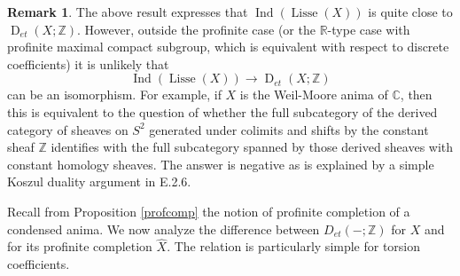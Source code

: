 \documentclass[12pt]{article}
\theoremstyle{definition}
\newtheorem{remark}[theorem]{Remark}
\newcommand{\on}{\operatorname}
\newcommand{\mbb}{\mathbb}
\newcommand{\wh}{\widehat}
\begin{document}
\begin{remark}
The above result expresses that $\on{Ind}(\on{Lisse}(X))$ is quite close to $\on{D}_{et}(X;\mbb{Z})$.  However, outside the profinite case (or the $\mbb{R}$-type case with profinite maximal compact subgroup, which is equivalent with respect to discrete coefficients) it is unlikely that
$$\on{Ind}(\on{Lisse}(X)) \to \on{D}_{et}(X;\mbb{Z})$$
can be an isomorphism.  For example, if $X$ is the Weil-Moore anima of $\mbb{C}$, then this is equivalent to the question of whether the full subcategory of the derived category of sheaves on $S^2$ generated under colimits and shifts by the constant sheaf $\mbb{Z}$ identifies with the full subcategory spanned by those derived sheaves with constant homology sheaves.  The  answer is negative as is explained by a simple Koszul duality argument in \cite{locsysres} E.2.6.
\end{remark}

Recall from Proposition \ref{profcomp} the notion of profinite completion of a condensed anima.  We now analyze the difference between $D_{et}(-;\mbb{Z})$ for $X$ and for its profinite completion $\wh{X}$.  The relation is particularly simple for torsion coefficients.
\end{document}
